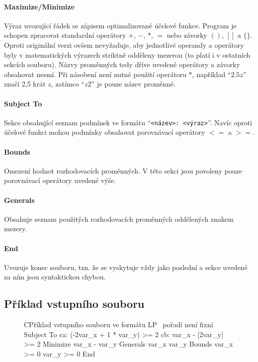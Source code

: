 \documentclass[czech, sem, kiv, he, pdf, viewonly]{fasthesis}
\begin{document}
\paragraph{Maximize/Minimize}
Výraz uvozující řádek se zápisem optimalizované účelové funkce. Program je schopen zpracovat standardní operátory $+$, $-$, $*$, $=$ nebo závorky $()$, $[]$ a $\{\}$. Oproti originální verzi ovšem nevyžaduje, aby jednotlivé operandy a operátory byly v matematických výrazech striktně odděleny mezerou (to platí i v ostatních sekcích souboru). Názvy proměnných tedy dříve uvedené operátory a závorky obsahovat nesmí. Při násobení není nutné použití operátoru $*$, například ``$2.5z$'' značí 2,5 krát $z$, zatímco ``$z2$'' je pouze název proměnné.

\paragraph{Subject To}
Sekce obsahující seznam podmínek ve formátu ``\texttt{<název>: <výraz>}''.
Navíc oproti účelové funkci mohou podmínky obsahovat porovnávací
operátory $<=$ a $>=$.

\paragraph{Bounds}
Omezení hodnot rozhodovacích proměnných. V této sekci jsou povoleny
pouze porovnávací operátory uvedené výše.

\paragraph{Generals}
Obsahuje seznam použitých rozhodovacích proměnných oddělených znakem mezery.

\paragraph{End}
Uvozuje konec souboru, tzn. že se vyskytuje vždy jako poslední a sekce
uvedené za ním jsou syntaktickou chybou.

\subsection{Příklad vstupního souboru}
\begin{figure}[H]
\begin{code}{C}{Příklad vstupního souboru ve formátu LP\label{lst:demoLP}}
\ pořadí není fixní
Subject To
ca: (-2var_x + 1 * var_y) >= 2
cb: var_x - [2var_y] >= 2
Minimize
var_x - var_y
Generals
var_x var_y
Bounds
var_x >= 0
var_y >= 0
End
\end{code}
\end{figure}
\end{document}
